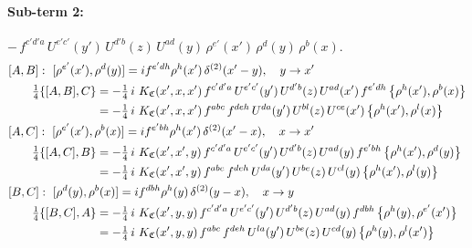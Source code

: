 \documentclass[10pt]{article}
\numberwithin{equation}{section}
\begin{document}
\paragraph{Sub-term 2:} $-\,f^{c'd'a}\,U^{e'c'}(y')\,U^{d'b}(z)\,U^{ad}(y)\,\rho^{e'}(x')\,\rho^{d}(y)\,\rho^{b}(x)$.
\begin{align}
&[A,B]:\ [\rho^{e'}(x'),\rho^{d}(y)]=i f^{e'dh}\rho^{h}(x')\,\delta^{(2)}(x'-y),\quad y\to x'\notag\\
&\qquad \tfrac14\{[A,B],C\}=-\tfrac14\,i\,\,K_{\mathfrak C}(x',x,x')\,f^{c'd'a}\,U^{e'c'}(y')\,U^{d'b}(z)\,U^{ad}(x')\,f^{e'dh}\,\big\{\rho^{h}(x'),\rho^{b}(x)\big\}\notag\\
&\qquad\phantom{\tfrac14\{[A,B],C\}}=-\tfrac14\,i\,\,K_{\mathfrak C}(x',x,x')\,f^{abc}\,f^{deh}\,U^{da}(y')\,U^{bl}(z)\,U^{ce}(x')\,\big\{\rho^{h}(x'),\rho^{l}(x)\big\}
\label{eq:GIII.VI-2-AB}\\
&[A,C]:\ [\rho^{e'}(x'),\rho^{b}(x)]=i f^{e'bh}\rho^{h}(x')\,\delta^{(2)}(x'-x),\quad x\to x'\notag\\
&\qquad \tfrac14\{[A,C],B\}=-\tfrac14\,i\,\,K_{\mathfrak C}(x',x',y)\,f^{c'd'a}\,U^{e'c'}(y')\,U^{d'b}(z)\,U^{ad}(y)\,f^{e'bh}\,\big\{\rho^{h}(x'),\rho^{d}(y)\big\}\notag\\
&\qquad\phantom{\tfrac14\{[A,C],B\}}=-\tfrac14\,i\,\,K_{\mathfrak C}(x',x',y)\,f^{abc}\,f^{deh}\,U^{da}(y')\,U^{be}(z)\,U^{cl}(y)\,\big\{\rho^{h}(x'),\rho^{l}(y)\big\}
\label{eq:GIII.VI-2-AC}\\
&[B,C]:\ [\rho^{d}(y),\rho^{b}(x)]=i f^{dbh}\rho^{h}(y)\,\delta^{(2)}(y-x),\quad x\to y\notag\\
&\qquad \tfrac14\{[B,C],A\}=-\tfrac14\,i\,\,K_{\mathfrak C}(x',y,y)\,f^{c'd'a}\,U^{e'c'}(y')\,U^{d'b}(z)\,U^{ad}(y)\,f^{dbh}\,\big\{\rho^{h}(y),\rho^{e'}(x')\big\}\notag\\
&\qquad\phantom{\tfrac14\{[B,C],A\}}=-\tfrac14\,i\,\,K_{\mathfrak C}(x',y,y)\,f^{abc}\,f^{deh}\,U^{la}(y')\,U^{be}(z)\,U^{cd}(y)\,\big\{\rho^{h}(y),\rho^{l}(x')\big\}
\label{eq:GIII.VI-2-BC}
\end{align}
\end{document}
